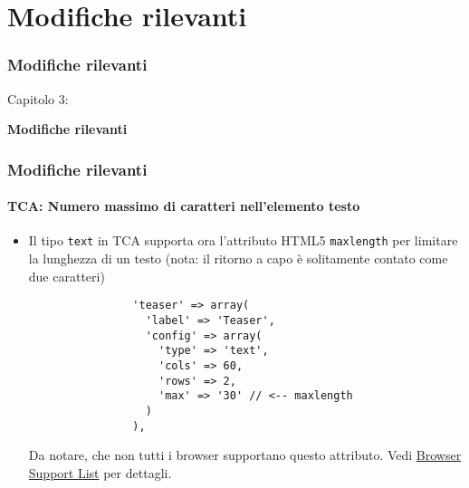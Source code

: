 %

\section{Modifiche rilevanti}
\begin{frame}[fragile]
	\frametitle{Modifiche rilevanti}

	\begin{center}\huge{Capitolo 3:}\end{center}
	\begin{center}\huge{\color{typo3darkgrey}\textbf{Modifiche rilevanti}}\end{center}

\end{frame}


\begin{frame}[fragile]
	\frametitle{Modifiche rilevanti}
	\framesubtitle{TCA: Numero massimo di caratteri nell'elemento testo}

	\begin{itemize}
		\item Il tipo \texttt{text} in TCA supporta ora l'attributo HTML5 \texttt{maxlength}
			per limitare la lunghezza di un testo (nota: il ritorno a capo è solitamente contato come due
			caratteri)

			\begin{lstlisting}
				'teaser' => array(
				  'label' => 'Teaser',
				  'config' => array(
				    'type' => 'text',
				    'cols' => 60,
				    'rows' => 2,
				    'max' => '30' // <-- maxlength
				  )
				),
			\end{lstlisting}

			Da notare, che non tutti i browser supportano questo attributo.\newline
			Vedi \href{http://www.w3schools.com/tags/att_textarea_maxlength.asp}{Browser Support List} per dettagli.

	\end{itemize}

\end{frame}

